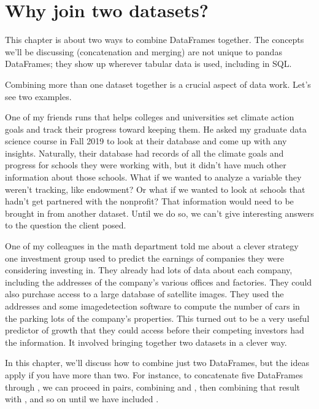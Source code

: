 \documentclass[letterpaper,10pt,english]{sphinxmanual}
\begin{document}
\section{Why join two datasets?}
\label{\detokenize{chapter-12-concat-and-merge:why-join-two-datasets}}
This chapter is about two ways to combine DataFrames together.  The concepts we’ll be discussing (concatenation and merging) are not unique to pandas DataFrames; they show up wherever tabular data is used, including in SQL.

Combining more than one dataset together is a crucial aspect of data work.  Let’s see two examples.

  One of my friends runs  that helps colleges and universities set climate action goals and track their progress toward keeping them.  He asked my graduate data science course in Fall 2019 to look at their database and come up with any insights.  Naturally, their database had records of all the climate goals and progress for schools they were working with, but it didn’t have much other information about those schools.  What if we wanted to analyze a variable they weren’t tracking, like endowment?  Or what if we wanted to look at schools that hadn’t get partnered with the nonprofit?  That information would need to be brought in from another dataset.  Until we do so, we can’t give interesting answers to the question the client posed.

  One of my colleagues in the math department told me about a clever strategy one investment group used to predict the earnings of companies they were considering investing in.  They already had lots of data about each company, including the addresses of the company’s various offices and factories.  They could also purchase access to a large database of satellite images.  They used the addresses and some image\sphinxhyphen{}detection software to compute the number of cars in the parking lots of the company’s properties.  This turned out to be a very useful predictor of growth that they could access before their competing investors had the information.  It involved bringing together two datasets in a clever way.

In this chapter, we’ll discuss how to combine just two DataFrames, but the ideas apply if you have more than two.  For instance, to concatenate five DataFrames  through , we can proceed in pairs, combining  and , then combining that result with , and so on until we have included .
\end{document}
